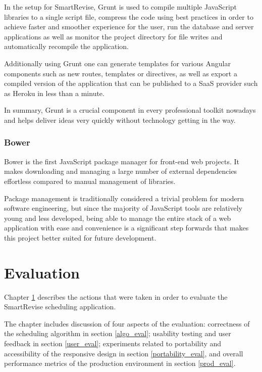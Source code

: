 \documentclass[bsc,frontabs,twoside,singlespacing,parskip]{infthesis}     %
\begin{document}
			In the setup for SmartRevise, Grunt is used to compile multiple JavaScript libraries to a single script file, compress the code using best practices in order to achieve faster and smoother experience for the user, run the database and server applications as well as monitor the project directory for file writes and automatically recompile the application.

			Additionally using Grunt one can generate templates for various Angular components such as new routes, templates or directives, as well as export a compiled version of the application that can be published to a SaaS provider such as Heroku in less than a minute.

			In summary, Grunt is a crucial component in every professional toolkit nowadays and helps deliver ideas very quickly without technology getting in the way.

		\subsection{Bower}
			Bower is the first JavaScript package manager for front-end web projects. It makes downloading and managing a large number of external dependencies effortless compared to manual management of libraries.

			Package management is traditionally considered a trivial problem for modern software engineering, but since the majority of JavaScript tools are relatively young and less developed, being able to manage the entire stack of a web application with ease and convenience is a significant step forwards that makes this project better suited for future development.




\chapter{Evaluation}\label{evaluation}

	Chapter \ref{evaluation} describes the actions that were taken in order to evaluate the SmartRevise scheduling application.

	The chapter includes discussion of four aspects of the evaluation: correctness of the scheduling algorithm in section \ref{algo_eval}; usability testing and user feedback in section \ref{user_eval}; experiments related to portability and accessibility of the responsive design in section \ref{portability_eval}, and overall performance metrics of the production environment in section \ref{prod_eval}.
\end{document}
